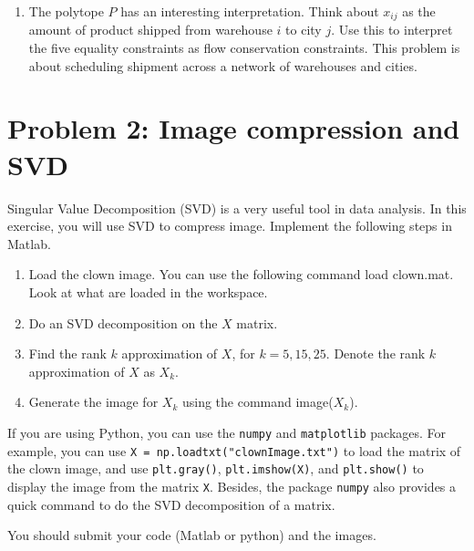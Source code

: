 \documentclass[11pt]{article}
\begin{document}
\begin{enumerate}


\item The polytope $P$ has an interesting interpretation. Think about $x_{ij}$ as the amount of product shipped from warehouse $i$ to city $j$. Use this to interpret the five equality constraints as flow conservation constraints. This problem is about scheduling shipment across a network of warehouses and cities.
\end{enumerate}

\section*{Problem 2: Image compression and SVD}
Singular Value Decomposition (SVD) is a very useful tool in data analysis. In this exercise, you will use SVD to compress image. Implement the following steps in Matlab.
\begin{enumerate}
	\item Load the clown image. You can use the following command \textsf{load clown.mat}. Look at what are loaded in the workspace.
	\item Do an SVD decomposition on the $X$ matrix. 
	\item Find the rank $k$ approximation of $X$, for $k=5, 15, 25$. Denote the rank $k$ approximation of $X$ as $X_k$.
	\item Generate the image for $X_k$ using the command \textsf{image($X_k$)}.
\end{enumerate}

If you are using Python, you can use the \texttt{numpy} and \texttt{matplotlib} packages. For example, you can use \verb|X = np.loadtxt("clownImage.txt")| to load the matrix of the clown image, and use \verb|plt.gray()|, \verb|plt.imshow(X)|, and \verb|plt.show()| to display the image from the matrix \texttt{X}. Besides, the package \texttt{numpy} also provides a quick command to do the SVD decomposition of a matrix.

You should submit your code (Matlab or python) and the images.
\end{document}
